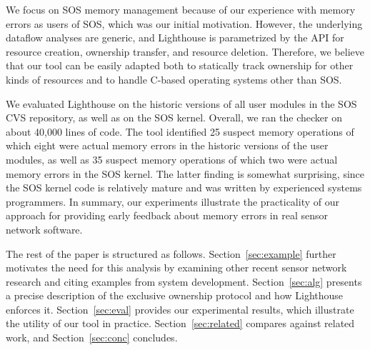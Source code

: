 We focus on SOS memory management because of our experience with memory
errors as users of SOS, which was our initial motivation.  
%
%
However, the underlying dataflow analyses are generic, and Lighthouse is
parametrized by the API for resource creation, ownership transfer, and
resource deletion.  
%
Therefore, we believe that our tool can be easily adapted both to statically
track ownership for other kinds of resources and to handle C-based operating
systems other than SOS.


We evaluated Lighthouse on the historic versions of all user modules in the
SOS CVS repository, as well as on the SOS kernel.  
%
Overall, we ran the checker on about 40,000 lines of code.  
%
The tool identified 25 suspect memory operations of which eight were actual
memory errors in the historic versions of the user modules, as well as 35
suspect memory operations of which two were actual memory errors in the SOS
kernel.  
%
The latter finding is somewhat surprising, since the SOS kernel code is
relatively mature and was written by experienced systems programmers.  
%
In summary, our experiments illustrate the practicality of our approach for
providing early feedback about memory errors in real sensor network
software.



The rest of the paper is structured as follows.  
%
Section~\ref{sec:example} further motivates the need for this analysis by
examining other recent sensor network research and citing examples from
system development.
%
Section~\ref{sec:alg} presents a precise description of the exclusive
ownership protocol and how Lighthouse enforces it.  
%
Section~\ref{sec:eval} provides our experimental results, which illustrate
the utility of our tool in practice.  
%
Section~\ref{sec:related} compares against related work, and
Section~\ref{sec:conc} concludes.



